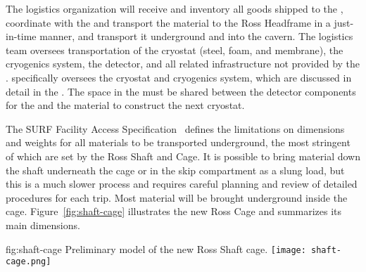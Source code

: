 The  logistics organization will receive and inventory all goods shipped to the , coordinate with the  and transport the material to the Ross Headframe in a just-in-time manner, and transport it underground and into the cavern.
The  logistics team oversees transportation of the cryostat (steel, foam, and membrane), the cryogenics system, the detector, and all related infrastructure not provided by the .
 specifically oversees the cryostat and cryogenics system, which are discussed in detail in the  .
The space in the  must be shared between the detector components for the  and the  material to construct the next cryostat.

The SURF Facility Access Specification~\cite{bib:docdb328} defines the limitations on dimensions and weights for all materials to be transported underground, the most stringent of which are set by the Ross Shaft and Cage.
It is possible to bring material down the shaft underneath the cage or in the skip compartment as a slung load, but this is a much slower process and requires careful planning and review of detailed procedures for each trip.
Most material will be brought underground inside the cage.
Figure~\ref{fig:shaft-cage} illustrates the new Ross Cage and summarizes its main dimensions.
\begin{dunefigure}{fig:shaft-cage}
{Preliminary model of the new Ross Shaft cage.}
\texttt{[image: shaft-cage.png]}
\end{dunefigure}

